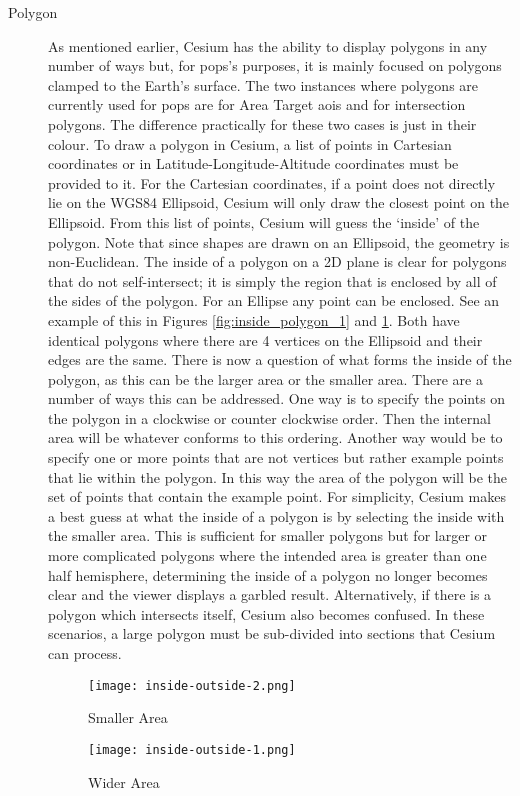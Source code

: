 \begin{description}
    \item[Polygon] As mentioned earlier, Cesium has the ability to display
	polygons in any number of ways but, for \gls{pops}'s purposes, it is
	mainly focused on polygons clamped to the Earth's surface. The two
	instances where polygons are currently used for \gls{pops} are for Area
	Target \glspl{aoi} and for intersection polygons. The difference
	practically for these two cases is just in their colour.  To draw a
	polygon in Cesium, a list of points in Cartesian coordinates or in
	Latitude-Longitude-Altitude coordinates must be provided to it.  For
	the Cartesian coordinates, if a point does not directly lie on the
	WGS84 Ellipsoid, Cesium will only draw the closest point on the
	Ellipsoid.  From this list of points, Cesium will guess the `inside' of
	the polygon. Note that since shapes are drawn on an Ellipsoid, the
	geometry is non-Euclidean. The inside of a polygon on a 2D plane is
	clear for polygons that do not self-intersect; it is simply the region
	that is enclosed by all of the sides of the polygon.  For an Ellipse
	any point can be enclosed.  See an example of this in Figures
	\ref{fig:inside_polygon_1} and \ref{fig:inside_polygon_2}. Both have
	identical polygons where there are 4 vertices on the Ellipsoid and
	their edges are the same.  There is now a question of what forms the
	inside of the polygon, as this can be the larger area or the smaller
	area. There are a number of ways this can be addressed. One way is to
	specify the points on the polygon in a clockwise or counter clockwise
	order. Then the internal area will be whatever conforms to this
	ordering. Another way would be to specify one or more points that are
	not vertices but rather example points that lie within the polygon. In
	this way the area of the polygon will be the set of points that contain
	the example point. For simplicity, Cesium makes a best guess at what
	the inside of a polygon is by selecting the inside with the smaller
	area. This is sufficient for smaller polygons but for larger or more
	complicated polygons where the intended area is greater than one half
	hemisphere, determining the inside of a polygon no longer becomes clear
	and the viewer displays a garbled result.  Alternatively, if there is a
	polygon which intersects itself, Cesium also becomes confused. In these
	scenarios, a large polygon must be sub-divided into sections that
	Cesium can process.

\begin{figure}
    \begin{minipage}[c]{0.45\textwidth}
	\centering
	\texttt{[image: inside-outside-2.png]} 
	\caption{Smaller Area}
	\label{fig:inside_polygon_1}
    \end{minipage}
    \hfill
    \begin{minipage}[c]{0.45\textwidth}
	\centering
	\texttt{[image: inside-outside-1.png]} 
	\caption{Wider Area}
	\label{fig:inside_polygon_2}
    \end{minipage} 
\end{figure}




\end{description}
